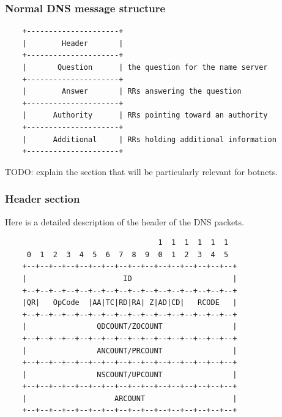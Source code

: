 \subsubsection{Normal DNS message structure}
\begin{verbatim}
    +---------------------+
    |        Header       |
    +---------------------+
    |       Question      | the question for the name server
    +---------------------+
    |        Answer       | RRs answering the question
    +---------------------+
    |      Authority      | RRs pointing toward an authority
    +---------------------+
    |      Additional     | RRs holding additional information
    +---------------------+

\end{verbatim}
TODO: explain the section that will be particularly relevant for botnets.
\subsubsection{Header section}
Here is a detailed description of the header of the DNS packets. 
\begin{verbatim}
	                               1  1  1  1  1  1
	 0  1  2  3  4  5  6  7  8  9  0  1  2  3  4  5
	+--+--+--+--+--+--+--+--+--+--+--+--+--+--+--+--+
	|                      ID                       |
	+--+--+--+--+--+--+--+--+--+--+--+--+--+--+--+--+
	|QR|   OpCode  |AA|TC|RD|RA| Z|AD|CD|   RCODE   |
	+--+--+--+--+--+--+--+--+--+--+--+--+--+--+--+--+
	|                QDCOUNT/ZOCOUNT                |
	+--+--+--+--+--+--+--+--+--+--+--+--+--+--+--+--+
	|                ANCOUNT/PRCOUNT                |
	+--+--+--+--+--+--+--+--+--+--+--+--+--+--+--+--+
	|                NSCOUNT/UPCOUNT                |
	+--+--+--+--+--+--+--+--+--+--+--+--+--+--+--+--+
	|                    ARCOUNT                    |
	+--+--+--+--+--+--+--+--+--+--+--+--+--+--+--+--+

\end{verbatim}

